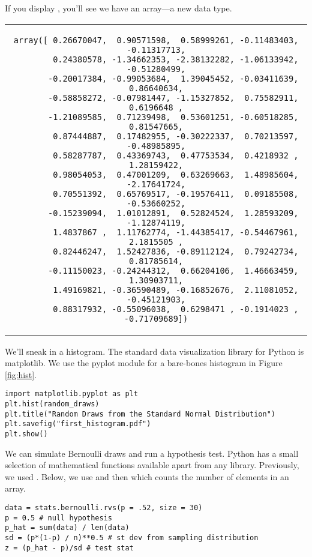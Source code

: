 \documentclass{article}
\begin{document}
\noindent If you display , you'll see we have an array---a new data type.

\begin{center}
\begin{tabular}{c}
\begin{lstlisting}[backgroundcolor=\color{white}, numbers = none]
    array([ 0.26670047,  0.90571598,  0.58999261, -0.11483403, -0.11317713,
        0.24380578, -1.34662353, -2.38132282, -1.06133942, -0.51280499,
       -0.20017384, -0.99053684,  1.39045452, -0.03411639,  0.86640634,
       -0.58858272, -0.07981447, -1.15327852,  0.75582911,  0.6196648 ,
       -1.21089585,  0.71239498,  0.53601251, -0.60518285,  0.81547665,
        0.87444887,  0.17482955, -0.30222337,  0.70213597, -0.48985895,
        0.58287787,  0.43369743,  0.47753534,  0.4218932 ,  1.28159422,
        0.98054053,  0.47001209,  0.63269663,  1.48985604, -2.17641724,
        0.70551392,  0.65769517, -0.19576411,  0.09185508, -0.53660252,
       -0.15239094,  1.01012891,  0.52824524,  1.28593209, -1.12874119,
        1.4837867 ,  1.11762774, -1.44385417, -0.54467961,  2.1815505 ,
        0.82446247,  1.52427836, -0.89112124,  0.79242734,  0.81785614,
       -0.11150023, -0.24244312,  0.66204106,  1.46663459,  1.30903711,
        1.49169821, -0.36590489, -0.16852676,  2.11081052, -0.45121903,
        0.88317932, -0.55096038,  0.6298471 , -0.1914023 , -0.71709689])
\end{lstlisting}
\end{tabular}
\end{center}


\noindent We'll sneak in a histogram. The standard data visualization library for Python is matplotlib. We use the pyplot module for a bare-bones histogram in Figure \ref{fig:hist}.

\begin{lstlisting}
import matplotlib.pyplot as plt
plt.hist(random_draws)
plt.title("Random Draws from the Standard Normal Distribution")
plt.savefig("first_histogram.pdf")
plt.show()    
\end{lstlisting}

We can simulate Bernoulli draws and run a hypothesis test. Python has a small selection of mathematical functions available apart from any library. Previously, we used . Below, we use  and then  which counts the number of elements in  an array.

\begin{lstlisting}
data = stats.bernoulli.rvs(p = .52, size = 30)
p = 0.5 # null hypothesis
p_hat = sum(data) / len(data)
sd = (p*(1-p) / n)**0.5 # st dev from sampling distribution
z = (p_hat - p)/sd # test stat
\end{lstlisting}
\end{document}
